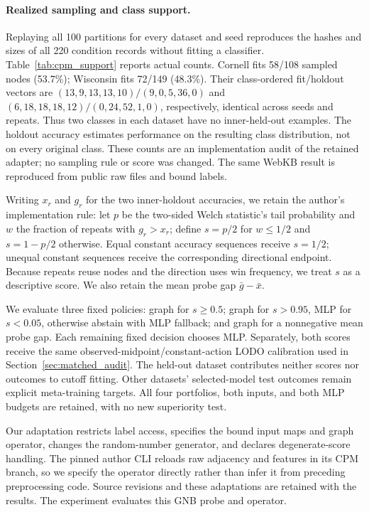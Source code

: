 \paragraph{Realized sampling and class support.}
Replaying all 100 partitions for every dataset and seed reproduces the hashes and sizes of all 220 condition records without fitting a classifier. Table~\ref{tab:cpm_support} reports actual counts. Cornell fits 58/108 sampled nodes (53.7\%); Wisconsin fits 72/149 (48.3\%). Their class-ordered fit/holdout vectors are $(13,9,13,13,10)/(9,0,5,36,0)$ and $(6,18,18,18,12)/(0,24,52,1,0)$, respectively, identical across seeds and repeats. Thus two classes in each dataset have no inner-held-out examples. The holdout accuracy estimates performance on the resulting class distribution, not on every original class. These counts are an implementation audit of the retained adapter; no sampling rule or score was changed. The same WebKB result is reproduced from public raw files and bound labels.



Writing $x_r$ and $g_r$ for the two inner-holdout accuracies, we retain the author's implementation rule: let $p$ be the two-sided Welch statistic's tail probability and $w$ the fraction of repeats with $g_r>x_r$; define $s=p/2$ for $w\leq 1/2$ and $s=1-p/2$ otherwise. Equal constant accuracy sequences receive $s=1/2$; unequal constant sequences receive the corresponding directional endpoint. Because repeats reuse nodes and the direction uses win frequency, we treat $s$ as a descriptive score. We also retain the mean probe gap $\bar g-\bar x$.

We evaluate three fixed policies: graph for $s\geq0.5$; graph for $s>0.95$, MLP for $s<0.05$, otherwise abstain with MLP fallback; and graph for a nonnegative mean probe gap. Each remaining fixed decision chooses MLP. Separately, both scores receive the same observed-midpoint/constant-action LODO calibration used in Section~\ref{sec:matched_audit}. The held-out dataset contributes neither scores nor outcomes to cutoff fitting. Other datasets' selected-model test outcomes remain explicit meta-training targets. All four portfolios, both inputs, and both MLP budgets are retained, with no new superiority test.

Our adaptation restricts label access, specifies the bound input maps and graph operator, changes the random-number generator, and declares degenerate-score handling. The pinned author CLI reloads raw adjacency and features in its CPM branch, so we specify the operator directly rather than infer it from preceding preprocessing code. Source revisions and these adaptations are retained with the results. The experiment evaluates this GNB probe and operator.

